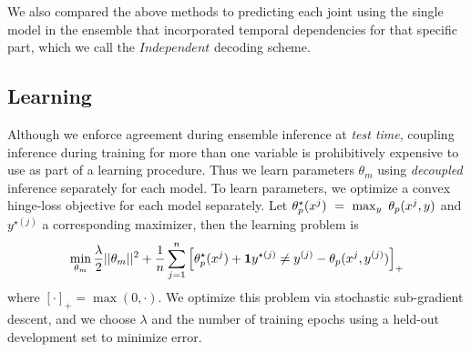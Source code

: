 We also compared the above methods to predicting each joint using the single model in
the ensemble that incorporated temporal dependencies for that
specific part, which we call the $Independent$ decoding scheme.


\subsection{Learning} Although we enforce agreement during ensemble inference 
at {\em test time}, coupling inference during training for more than one 
variable is prohibitively expensive to use as part of a learning procedure.  
Thus we learn
parameters $\theta_m$ using {\em decoupled} inference separately for
each model. To learn parameters, we optimize a convex hinge-loss
objective for each model separately. Let $\theta_p^\star(x^j)~=~\max_y~\theta_p(x^j,y)$ and $y^{\star(j)}$ a corresponding maximizer, then the learning problem is 
{\small
\begin{align*}
\min_{\theta_m} \frac{\lambda}{2}||\theta_m||^2 +
\frac{1}{n}\sum_{j=1}^n \left[ \theta_p^\star(x^j) + \mathbf{1}{y^{\star(j)} \neq y^{(j)}} - \theta_p(x^j,y^{(j)})  \right]_+
\end{align*}}
where $[\cdot]_+ = \max(0,\cdot)$.
We optimize
this problem via stochastic sub-gradient descent, and we choose
$\lambda$ and the number of training epochs using a held-out
development set to minimize error.



